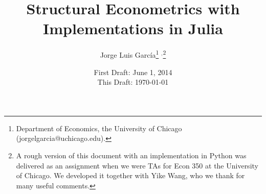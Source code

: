 



\title{\textbf{Structural Econometrics with Implementations in Julia}}
\author{Jorge Luis Garc\'{i}a\thanks{Department of Economics, the University of Chicago (jorgelgarcia@uchicago.edu).} $^{,}$\thanks{A rough version of this document with an implementation in Python was delivered as an assignment when we were TAs for Econ 350 at the University of Chicago. We developed it together with Yike Wang, who we thank for many useful comments.}}
\date{First Draft: June 1, 2014 \\ This Draft: \today}
\maketitle

\setcounter{section}{1}

